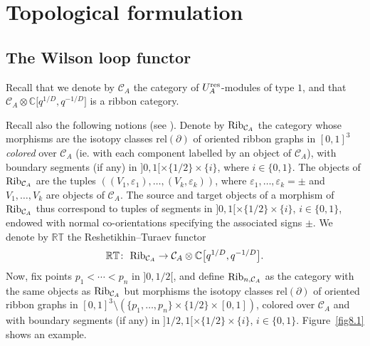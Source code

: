 \documentclass[pdftex]{sigma}%
\numberwithin{equation}{section}
\numberwithin{figure}{section}
\begin{document}
\section{Topological formulation}\label{SKEIN}

\subsection{The Wilson loop functor}\label{Wfunctor} Recall that we denote by $\mathcal{C}_A$ the category of $U_A^{\rm res}$-modules of type $1$, and that $\mathcal{C}_A \otimes {\mathbb C}\big[q^{1/D},q^{-1/D}\big]$ is a ribbon category.

Recall also the following notions (see \cite{Tu}). Denote by ${\rm Rib}_{\mathcal{C}_A}$ the category whose morphisms are the isotopy classes rel$(\partial)$ of oriented ribbon graphs in $[0,1]^3$ {\it colored} over $\mathcal{C}_A$ (ie. with each component labelled by an object of $\mathcal{C}_A$), with boundary segments (if any) in $]0,1[\times \{1/2\}\times \{i\}$, where $i\in \{0,1\}$. The objects of ${\rm Rib}_{\mathcal{C}_A}$ are the tuples $((V_1,\varepsilon_1),\dots,(V_k,\varepsilon_k))$, where $\varepsilon_1,\dots,\varepsilon_k=\pm$ and $V_1,\dots,V_k$ are objects of $\mathcal{C}_A$. The source and target objects of a morphism of ${\rm Rib}_{\mathcal{C}_A}$ thus correspond to tuples of segments in $]0,1[\times \{1/2\}\times \{i\}$, $i\in \{0,1\}$, endowed with normal co-orientations specifying the associated signs $\pm$. We denote by $\mathbb{RT}$ the Reshetikhin--Turaev functor
\begin{gather*}
\mathbb{RT}\colon\ {\rm Rib}_{\mathcal{C}_A}\to \mathcal{C}_A \otimes {\mathbb C}\big[q^{1/D},q^{-1/D}\big].
\end{gather*}
Now, fix points $p_1< \cdots <p_n$ in $]0,1/2[$, and define ${\rm Rib}_{n,\mathcal{C}_A}$ as the category with the same objects as ${\rm Rib}_{\mathcal{C}_A}$ but morphisms the isotopy classes rel$(\partial)$ of oriented ribbon graphs in $[0,1]^3\setminus (\{p_1,\dots,p_n\}\times \{1/2\}\times [0,1])$, colored over $\mathcal{C}_A$ and with boundary segments (if any) in $]1/2,1[\allowbreak\times \{1/2\}\times \{i\}$, $i\in\{0,1\}$. Figure~\ref{fig8.1} shows an example.
\end{document}
